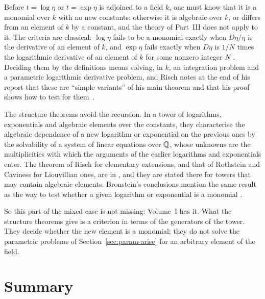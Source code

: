 Before $t = \log \eta$ or $t = \exp \eta$ is adjoined to a field $k$, one
must know that it is a monomial over $k$ with no new constants: otherwise
it is algebraic over $k$, or differs from an element of $k$ by a constant,
and the theory of Part~III does not apply to it. The criteria are classical:
$\log \eta$ fails to be a monomial exactly when $D\eta/\eta$ is the
derivative of an element of $k$, and $\exp \eta$ fails exactly when $D\eta$
is $1/N$ times the logarithmic derivative of an element of $k$ for some
nonzero integer $N$ . Deciding them by the
definitions means solving, in $k$, an integration problem and a parametric
logarithmic derivative problem, and Risch notes at the end of his report
that these are ``simple variants'' of his main theorem and that his proof
shows how to test for them~\cite[p.~219]{raab2022}.

The structure theorems avoid the recursion. In a tower of logarithms,
exponentials and algebraic elements over the constants, they characterise
the algebraic dependence of a new logarithm or exponential on the previous
ones by the solvability of a system of linear equations over $\mathbb{Q}$, whose
unknowns are the multiplicities with which the arguments of the earlier
logarithms and exponentials enter. The theorem of Risch for elementary
extensions, and that of Rothstein and Caviness for Liouvillian ones, are in
, and they are stated there for towers that may contain
algebraic elements. Bronstein's conclusions mention the same result as the
way to test whether a given logarithm or exponential is a monomial
\cite[Conclusions]{bronstein1990}.

So this part of the mixed case is not missing: Volume~I has it. What the
structure theorems give is a criterion in terms of the generators of the
tower. They decide whether the new element is a monomial; they do not
solve the parametric problems of Section~\ref{sec:param-arise} for an
arbitrary element of the field.

\section{Summary}\label{sec:param-summary}

